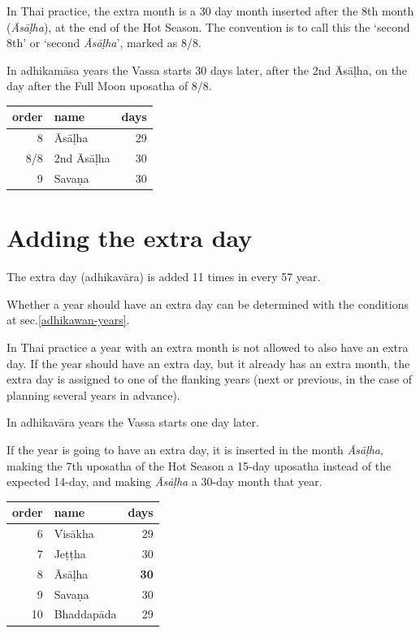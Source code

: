 \documentclass[11pt,oneside]{memoir-article}
\begin{document}
In Thai practice, the extra month is a 30 day month inserted after the
8th month (\emph{Āsāḷha}), at the end of the Hot Season. The convention is
to call this the `second 8th' or `second \emph{Āsāḷha}', marked as 8/8.

In adhikamāsa years the Vassa starts 30 days later, after the 2nd
Āsāḷha, on the day after the Full Moon uposatha of 8/8.

\begin{center}
\begin{tabular}{rlr}
order & name & days\\
\hline
8 & Āsāḷha & 29\\
8/8 & 2nd Āsāḷha & 30\\
9 & Savaṇa & 30\\
\end{tabular}
\end{center}
\section{Adding the extra day}
\label{sec-1-3}
\label{adding-extra-day}

The extra day (adhikavāra) is added 11 times in every 57 year.

Whether a year should have an extra day can be determined with the
conditions at sec.\ref{adhikawan-years}.

In Thai practice a year with an extra month is not allowed to also
have an extra day. If the year should have an extra day, but it
already has an extra month, the extra day is assigned to one of the
flanking years (next or previous, in the case of planning several
years in advance).

In adhikavāra years the Vassa starts one day later.

If the year is going to have an extra day, it is inserted in the month
\emph{Āsāḷha}, making the 7th uposatha of the Hot Season a 15-day uposatha
instead of the expected 14-day, and making \emph{Āsāḷha} a 30-day month
that year.\cite{hasapannyo-zodiac}

\begin{center}
\begin{tabular}{rlr}
order & name & days\\
\hline
6 & Visākha & 29\\
7 & Jeṭṭha & 30\\
8 & Āsāḷha & \textbf{30}\\
9 & Savaṇa & 30\\
10 & Bhaddapāda & 29\\
\end{tabular}
\end{center}
\end{document}

